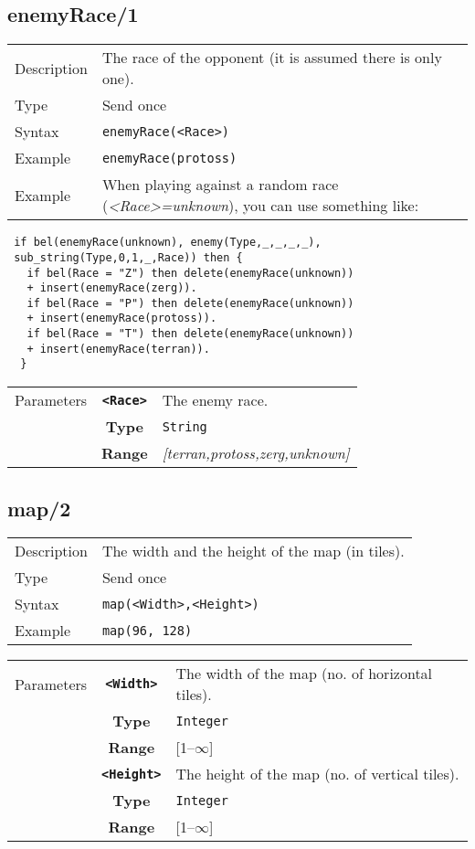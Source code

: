 \newpage

\subsection{enemyRace/1}
\begin{tabularx}{\textwidth}{lX}
 Description & The race of the opponent (it is assumed there is only one). \\
 Type & Send once \\
 Syntax &  \verb|enemyRace(<Race>)| \\
 Example & \verb|enemyRace(protoss)| \\
 Example & When playing against a random race (\textit{<Race>=unknown}), you can use something like:
 \end{tabularx}
 \begin{lstlisting}
 if bel(enemyRace(unknown), enemy(Type,_,_,_,_),
 sub_string(Type,0,1,_,Race)) then {
   if bel(Race = "Z") then delete(enemyRace(unknown))
   + insert(enemyRace(zerg)).
   if bel(Race = "P") then delete(enemyRace(unknown))
   + insert(enemyRace(protoss)).
   if bel(Race = "T") then delete(enemyRace(unknown))
   + insert(enemyRace(terran)).
  }
 \end{lstlisting}
 \begin{tabularx}{\textwidth}{l | c | p{8cm}|}
 \cline{2-3}
  Parameters & \textbf{\verb|<Race>|} & The enemy race. \\
             & \textbf{Type} & \verb|String| \\
             & \textbf{Range} & \textit{[terran,protoss,zerg,unknown]} \\
            \cline{2-3}
\end{tabularx}

\subsection{map/2}
\begin{tabularx}{\textwidth}{lX}
 Description & The width and the height of the map (in tiles). \\
 Type & Send once \\
 Syntax & \verb|map(<Width>,<Height>)| \\
 Example & \verb|map(96, 128)| \\
 \end{tabularx}
 \begin{tabularx}{\textwidth}{l | c | p{8cm}|}
 \cline{2-3}
  Parameters & \textbf{\verb|<Width>|} & The width of the map (no. of horizontal tiles).\\
            & \textbf{Type} & \verb|Integer| \\
            & \textbf{Range} & [1--$\infty$] \\
            \cline{2-3}
            & \textbf{\verb|<Height>|} & The height of the map (no. of vertical tiles).\\
            & \textbf{Type} & \verb|Integer| \\
            & \textbf{Range} & [1--$\infty$] \\
            \cline{2-3}
\end{tabularx}

